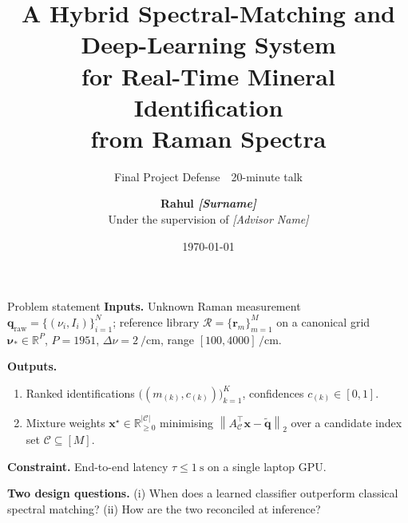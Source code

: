 \documentclass[10pt,aspectratio=169]{beamer}
\title[Raman-AI]{\textbf{A Hybrid Spectral-Matching and Deep-Learning System\\[0.18em]
        for Real-Time Mineral Identification\\[0.18em] from Raman Spectra}}
\subtitle{Final Project Defense \,\textbar\, 20-minute talk}
\author[Rahul]{\textbf{Rahul \textit{[Surname]}}\\[0.3em]
        \small Under the supervision of \textit{[Advisor Name]}}
\institute{Department of \textit{[Discipline]} \,\textbar\, \textit{[Institution Name]}}
\date{\today}
\newcommand{\cmone}{\si{\per\centi\meter}}
\newcommand{\R}{\mathbb{R}}
\newcommand{\norm}[1]{\left\lVert #1 \right\rVert}
\begin{document}
\maketitle

\begin{frame}{Problem statement}
\textbf{Inputs.} Unknown Raman measurement
$\mathbf{q}_{\text{raw}} = \{(\nu_i, I_i)\}_{i=1}^{N}$;
reference library $\mathcal{R} = \{\mathbf{r}_m\}_{m=1}^{M}$
on a canonical grid $\bm{\nu}_{*} \in \R^{P}$,
$P{=}1951$, $\Delta\nu{=}\SI{2}{\per\centi\meter}$, range $[100, 4000]\,\cmone$.
\medskip

\textbf{Outputs.}
\begin{enumerate}
  \item Ranked identifications $\bigl((m_{(k)}, c_{(k)})\bigr)_{k=1}^{K}$,
        confidences $c_{(k)} \in [0,1]$.
  \item Mixture weights
        $\mathbf{x}^{\star} \in \R_{\geq 0}^{|\mathcal{C}|}$ minimising
        $\norm{A_{\mathcal{C}}^{\!\top}\mathbf{x} - \tilde{\mathbf{q}}}_{2}$
        over a candidate index set $\mathcal{C} \subseteq [M]$.
\end{enumerate}
\medskip

\textbf{Constraint.} End-to-end latency
$\tau \leq \SI{1}{\second}$ on a single laptop GPU.
\medskip

\textbf{Two design questions.}
(i) When does a learned classifier outperform classical spectral matching?
(ii) How are the two reconciled at inference?
\end{frame}
\end{document}
